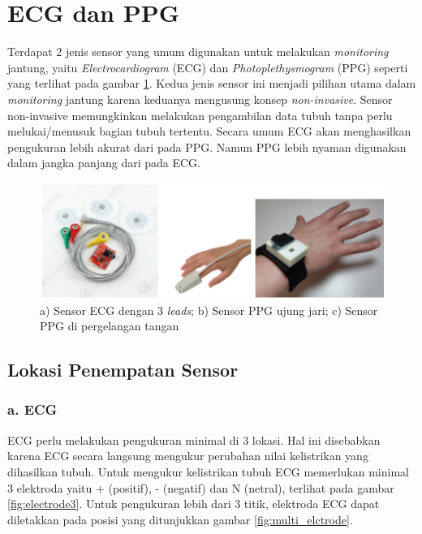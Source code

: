 \section{ECG dan PPG}
Terdapat 2 jenis sensor yang umum digunakan untuk melakukan \textit{monitoring} jantung, yaitu \textit{Electrocardiogram} (ECG) dan \textit{Photoplethysmogram} (PPG) seperti yang terlihat pada gambar \ref{fig:ecg_n_ppg}. Kedua jenis sensor ini menjadi pilihan utama dalam \textit{monitoring} jantung karena keduanya mengusung konsep \textit{non-invasive}. Sensor non-invasive memungkinkan melakukan pengambilan data tubuh tanpa perlu melukai/menusuk bagian tubuh tertentu. Secara umum ECG akan menghasilkan pengukuran lebih akurat dari pada PPG. Namun PPG lebih nyaman digunakan dalam jangka panjang dari pada ECG.

\begin{figure}[H]
    \centering
    \includegraphics[scale=0.3]{images/sensors.png}
    \caption{a) Sensor ECG dengan 3 \textit{leads}; b) Sensor PPG ujung jari; c) Sensor PPG di pergelangan tangan}
    \label{fig:ecg_n_ppg}
\end{figure}

\subsection{Lokasi Penempatan Sensor}
\subsubsection{a. ECG}
ECG perlu melakukan pengukuran minimal di 3 lokasi. Hal ini disebabkan karena ECG secara langsung mengukur perubahan nilai kelistrikan yang dihasilkan tubuh. Untuk mengukur kelistrikan tubuh ECG memerlukan minimal 3 elektroda yaitu + (positif), - (negatif) dan N (netral), terlihat pada gambar \ref{fig:electrode3}. Untuk pengukuran lebih dari 3 titik, elektroda ECG dapat diletakkan pada posisi yang ditunjukkan gambar \ref{fig:multi_elctrode}.

